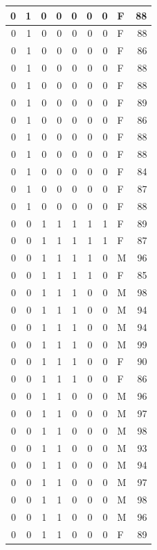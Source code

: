 \documentclass[
  12pt,
]{krantz}
\begin{document}
\begin{tabular}{r|r|r|r|r|r|r|l|r}
\hline
0 & 1 & 0 & 0 & 0 & 0 & 0 & F & 88\\
\hline
0 & 1 & 0 & 0 & 0 & 0 & 0 & F & 88\\
\hline
0 & 1 & 0 & 0 & 0 & 0 & 0 & F & 86\\
\hline
0 & 1 & 0 & 0 & 0 & 0 & 0 & F & 88\\
\hline
0 & 1 & 0 & 0 & 0 & 0 & 0 & F & 88\\
\hline
0 & 1 & 0 & 0 & 0 & 0 & 0 & F & 89\\
\hline
0 & 1 & 0 & 0 & 0 & 0 & 0 & F & 86\\
\hline
0 & 1 & 0 & 0 & 0 & 0 & 0 & F & 88\\
\hline
0 & 1 & 0 & 0 & 0 & 0 & 0 & F & 88\\
\hline
0 & 1 & 0 & 0 & 0 & 0 & 0 & F & 84\\
\hline
0 & 1 & 0 & 0 & 0 & 0 & 0 & F & 87\\
\hline
0 & 1 & 0 & 0 & 0 & 0 & 0 & F & 88\\
\hline
0 & 0 & 1 & 1 & 1 & 1 & 1 & F & 89\\
\hline
0 & 0 & 1 & 1 & 1 & 1 & 1 & F & 87\\
\hline
0 & 0 & 1 & 1 & 1 & 1 & 0 & M & 96\\
\hline
0 & 0 & 1 & 1 & 1 & 1 & 0 & F & 85\\
\hline
0 & 0 & 1 & 1 & 1 & 0 & 0 & M & 98\\
\hline
0 & 0 & 1 & 1 & 1 & 0 & 0 & M & 94\\
\hline
0 & 0 & 1 & 1 & 1 & 0 & 0 & M & 94\\
\hline
0 & 0 & 1 & 1 & 1 & 0 & 0 & M & 99\\
\hline
0 & 0 & 1 & 1 & 1 & 0 & 0 & F & 90\\
\hline
0 & 0 & 1 & 1 & 1 & 0 & 0 & F & 86\\
\hline
0 & 0 & 1 & 1 & 0 & 0 & 0 & M & 96\\
\hline
0 & 0 & 1 & 1 & 0 & 0 & 0 & M & 97\\
\hline
0 & 0 & 1 & 1 & 0 & 0 & 0 & M & 98\\
\hline
0 & 0 & 1 & 1 & 0 & 0 & 0 & M & 93\\
\hline
0 & 0 & 1 & 1 & 0 & 0 & 0 & M & 94\\
\hline
0 & 0 & 1 & 1 & 0 & 0 & 0 & M & 97\\
\hline
0 & 0 & 1 & 1 & 0 & 0 & 0 & M & 98\\
\hline
0 & 0 & 1 & 1 & 0 & 0 & 0 & M & 96\\
\hline
0 & 0 & 1 & 1 & 0 & 0 & 0 & F & 89\\

\end{tabular}
\end{document}
